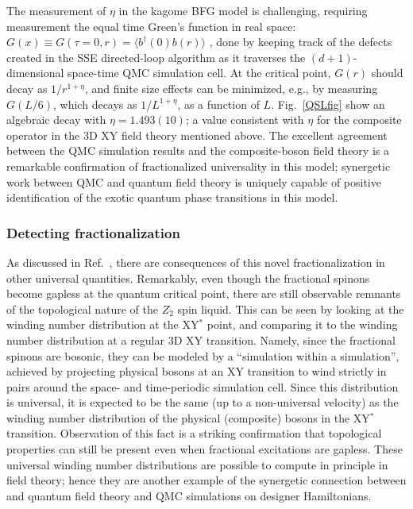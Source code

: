 \documentclass[10pt,pre,aps,twocolumn,showpacs,superscriptaddress,floatfix]{revtex4-1}
\begin{document}
The measurement of $\eta$ in the kagome BFG model is challenging, requiring measurement the equal time Green's function in real space: 
$G(x)\equiv G(\tau=0,r) = \langle b^\dagger(0) b(r) \rangle$ \cite{WormA,gfsse}, done by keeping track of the defects created in the SSE directed-loop algorithm \cite{Syljuasen02} 
as it traverses the $(d+1)$-dimensional space-time QMC simulation cell.  At the critical point, $G(r)$ should decay as $1/r^{1+\eta}$, and finite size effects can be minimized, e.g., by measuring $G(L/6)$, which decays as $1/L^{1+\eta}$, as a function of $L$.  Fig.~\ref{QSLfig} show an algebraic decay with $\eta=1.493(10)$; a value consistent with $\eta$ for the composite operator in the 3D XY field theory mentioned above.  The excellent agreement between the QMC simulation results and the composite-boson field theory is a remarkable confirmation of fractionalized universality in this model; synergetic work between QMC and quantum field theory is uniquely capable of positive identification of the exotic quantum phase transitions in this model.

\subsubsection{Detecting fractionalization}

As discussed in Ref.~\cite{XYstarQMC}, there are consequences of this novel fractionalization in other universal quantities.  Remarkably, even though the fractional spinons become gapless at the quantum critical point, there are still observable remnants of the topological nature of the $Z_2$ spin liquid.  This can be seen by looking at the winding number distribution at the 
XY$^*$ point, and comparing it to the winding number distribution at a regular 3D XY transition.  Namely, since the fractional spinons are bosonic, they can be modeled by a ``simulation within a simulation'', achieved by projecting physical bosons at an XY transition to wind strictly in pairs around the space- and time-periodic simulation cell.  Since this distribution is universal, it is expected to be the same (up to a non-universal velocity) as the winding number distribution of the physical (composite) bosons in the XY$^*$ transition.  Observation of this fact \cite{XYstarQMC} is a striking confirmation that topological properties can still be present even when fractional excitations are gapless.  These universal winding number distributions are possible to compute in principle in field theory; hence they are another example of the synergetic connection between and quantum field theory and QMC simulations on designer Hamiltonians.
\end{document}

